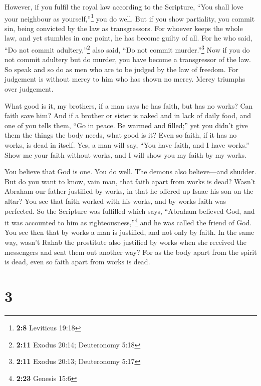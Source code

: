  However, if you fulfil the royal law according to the
Scripture, ``You shall love your neighbour as yourself,''\footnote{\textbf{2:8}
  Leviticus 19:18} you do well.  But if you show
partiality, you commit sin, being convicted by the law as transgressors.
 For whoever keeps the whole law, and yet stumbles in one
point, he has become guilty of all.  For he who said,
``Do not commit adultery,''\footnote{\textbf{2:11} Exodus 20:14;
  Deuteronomy 5:18} also said, ``Do not commit murder.''\footnote{\textbf{2:11}
  Exodus 20:13; Deuteronomy 5:17} Now if you do not commit adultery but
do murder, you have become a transgressor of the law.  So
speak and so do as men who are to be judged by the law of freedom.
 For judgement is without mercy to him who has shown no
mercy. Mercy triumphs over judgement.

 What good is it, my brothers, if a man says he has
faith, but has no works? Can faith save him?  And if a
brother or sister is naked and in lack of daily food, 
and one of you tells them, ``Go in peace. Be warmed and filled;'' yet
you didn't give them the things the body needs, what good is it?
 Even so faith, if it has no works, is dead in itself.
 Yes, a man will say, ``You have faith, and I have
works.'' Show me your faith without works, and I will show you my faith
by my works.

 You believe that God is one. You do well. The demons
also believe---and shudder.  But do you want to know,
vain man, that faith apart from works is dead?  Wasn't
Abraham our father justified by works, in that he offered up Isaac his
son on the altar?  You see that faith worked with his
works, and by works faith was perfected.  So the
Scripture was fulfilled which says, ``Abraham believed God, and it was
accounted to him as righteousness,''\footnote{\textbf{2:23} Genesis 15:6}
and he was called the friend of God.  You see then that
by works a man is justified, and not only by faith.  In
the same way, wasn't Rahab the prostitute also justified by works when
she received the messengers and sent them out another way?
 For as the body apart from the spirit is dead, even so
faith apart from works is dead.

\hypertarget{section-2}{%
\section{3}\label{section-2}}

